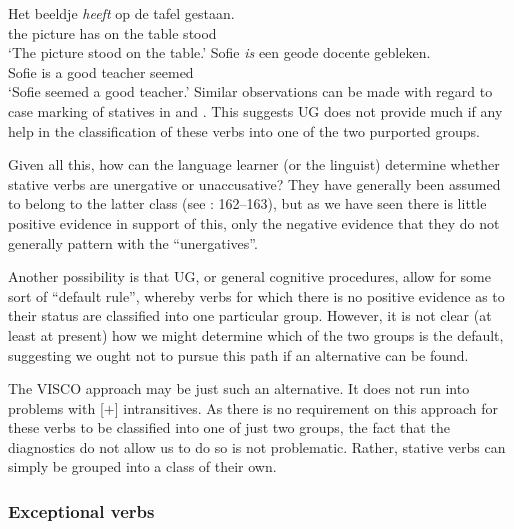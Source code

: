 \documentclass[output=paper]{langsci/langscibook}
\begin{document}
\ea {} \parencite[870]{Sorace2000}
    \ea
        \gll    Het   beeldje \textit{heeft} op   de   tafel   gestaan.\\
                the   picture   has   on   the   table   stood\\
        \glt    \enquote*{The picture stood on the table.}
    \ex
        \gll   Sofie \textit{is} een   geode   docente   gebleken.\\
               Sofie is a   good   teacher   seemed\\
        \glt   \enquote*{Sofie seemed a good teacher.}
    \z
\z
Similar observations can be made with regard to case marking of statives in
 and  \parencite{Baker2018}. This suggests
\gls{UG} does not provide much if any help in the
classification of these verbs into one of the two purported groups.

Given all this, how can the language learner (or the linguist) determine
wheth\-er  stative verbs are unergative or unaccusative? They have
generally been assumed to belong to the latter class (see
\citealt{Perlmutter1978}: 162–163), but as we have seen there is little
positive evidence in support of this, only the negative evidence that they do
not generally pattern with the \enquote{unergatives}.

Another possibility is that \gls{UG}, or general cognitive procedures, allow for some
sort of \enquote{default rule}, whereby verbs for which there is no positive
evidence as to their status are classified into one particular group. However,
it is not clear (at least at present) how we might determine which of the two
groups is the default, suggesting we ought not to pursue this path if an
alternative can be found.

The VISCO approach may be just such an alternative. It does not run into
problems with [$+$\State{}] intransitives. As there is no requirement on this
approach for these verbs to be classified into one of just two groups, the fact
that the diagnostics do not allow us to do so is not problematic. Rather,
stative verbs can simply be grouped into a class of their own.

\subsubsection{Exceptional verbs}\label{sec:baker:3.4.5}
\end{document}
